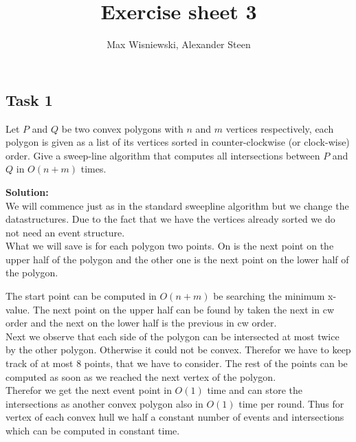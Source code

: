 \documentclass[11pt,a4paper,ngerman]{article}
\date{}
\title{Exercise sheet 3}
\author{Max Wisniewski, Alexander Steen}
\begin{document}

\renewcommand{\figurename}{Figure}

\maketitle
\thispagestyle{fancy}

\subsection*{Task 1}

Let $P$ and $Q$ be two convex polygons with $n$ and $m$ vertices respectively, each polygon is given as
a list of its vertices sorted in counter-clockwise (or clock-wise) order. Give a sweep-line algorithm
that computes all intersections between $P$ and $Q$ in $O(n + m)$ times.

\textbf{Solution:}\\

We will commence just as in the standard sweepline algorithm but we change the datastructures. Due to the fact
that we have the vertices already sorted we do not need an event structure.\\
What we will save is for each polygon two points. On is the next point on the upper half of the polygon
and the other one is the next point on the lower half of the polygon.

The start point can be computed in $O(n + m)$ be searching the minimum x-value. The next point on the upper half
can be found by taken the next in cw order and the next on the lower half is the previous in cw order.\\

Next we observe that each side of the polygon can be intersected at most twice by the other polygon. Otherwise
it could not be convex. Therefor we have to keep track of at most 8 points, that we have to consider. The rest of
the points can be computed as soon as we reached the next vertex of the polygon.\\

Therefor we get the next event point in $O(1)$ time and can store the intersections as another convex polygon also in $O(1)$ time
per round. Thus for vertex of each convex hull we half a constant number of events and intersections which can be computed in constant time.\\
\end{document}
